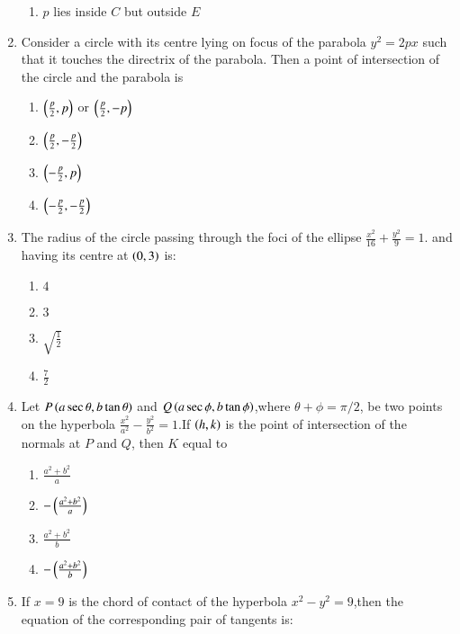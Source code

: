 \documentclass[journal,12pt,twocolumn]{IEEEtran}
\theoremstyle{remark}
\begin{document}
\begin{enumerate}
\begin{enumerate}
    \item $p$ lies inside $C$ but outside $E$ \\
\end{enumerate}
\item Consider a circle with its centre lying on focus of the parabola $y^2=2px$ such that it touches the directrix of the parabola. Then a point of intersection of the circle and the parabola is\hfill{}\\
\begin{enumerate}
    \item $\left(\frac{p}{2},p\right)$ or $\left(\frac{p}{2},-p\right)$
    \item $\left(\frac{p}{2},-\frac{p}{2}\right)$
    \item $\left(-\frac{p}{2},p\right)$
    \item $\left(-\frac{p}{2},-\frac{p}{2}\right)$\\
\end{enumerate}
\item The radius of the circle passing through the foci of the ellipse $\frac{x^2}{16}+\frac{y^2}{9}=1$. and having its centre at $\left(0,3\right)$ is:\hfill {}
\begin{enumerate}
    \item $4$
    \item $3$
    \item $\sqrt{\frac{1}{2}}$
    \item $\frac{7}{2}$\\
\end{enumerate}
\item Let $P\left(a\sec\theta,b\tan\theta\right)$ and $Q\left(a\sec\phi,b\tan \phi\right)$,where $\theta+\phi=\pi/2$, be two points on the hyperbola $\frac{x^2}{a^2}-\frac{y^2}{b^2}=1$.If $\left(h,k\right)$ is the point of intersection of the normals at $P$ and $Q$, then $K$ equal to \hfill {}\\
\begin{enumerate}
    \item $\frac{a^2+b^2}{a}$
    \item $-\left(\frac{a^2+b^2}{a}\right)$
    \item $\frac{a^2+b^2}{b}$
    \item $-\left(\frac{a^2+b^2}{b}\right)$\\
\end{enumerate}
\item If $x=9$ is the chord of contact of the hyperbola $x^2-y^2=9$,then the equation of the corresponding pair of tangents is:
\hfill {}\\

\end{enumerate}
\end{document}
